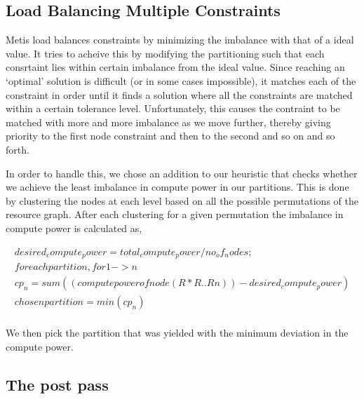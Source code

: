 \subsection{Load Balancing Multiple Constraints}

Metis load balances constraints by minimizing the imbalance with that of
a ideal value. It tries to acheive this by modifying the partitioning
such that each consrtaint lies within certain imbalance from the ideal
value. Since reaching an `optimal' solution is difficult (or in some
cases impossible), it matches each of the constraint in order until it
finds a solution where all the constraints are matched within a certain
tolerance level. Unfortunately, this causes the contraint to be matched
with more and more imbalance as we move further, thereby giving priority
to the first node constraint and then to the second and so on and so
forth.

In order to handle this, we chose an addition to our heuristic that
checks whether we achieve the least imbalance in compute power in our
partitions. This is done by clustering the nodes at each level based
on all the possible permutations of the resource graph. After each
clustering for a given permutation the imbalance in compute power is
calculated as,

\begin{equation}
\begin{array}{c}
desired_compute_power = total_compute_power / no_of_nodes;\\

for each partition, for 1->n\\
cp_n = sum( ( compute power of node ( R * R .. Rn ) ) -
desired_compute_power )\\

chosen partition = min( cp_n  )\\
\end{array}
\end{equation}

We then pick the partition that was yielded with the minimum deviation
in the compute power.

\subsection{The post pass}
\label{sec:post-pass}




